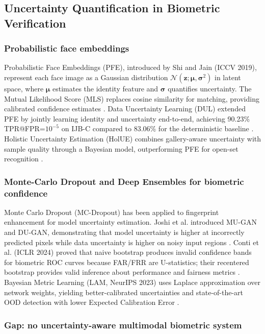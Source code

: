 \documentclass[10pt,journal,compsoc]{IEEEtran}
\begin{document}
\subsection{Uncertainty Quantification in Biometric Verification}

\subsubsection{Probabilistic face embeddings}

Probabilistic Face Embeddings (PFE), introduced by Shi and Jain (ICCV 2019), represent each face image as a Gaussian distribution $\mathcal{N}(\mathbf{z}; \boldsymbol{\mu}, \boldsymbol{\sigma}^2)$ in latent space, where $\boldsymbol{\mu}$ estimates the identity feature and $\boldsymbol{\sigma}$ quantifies uncertainty. The Mutual Likelihood Score (MLS) replaces cosine similarity for matching, providing calibrated confidence estimates \cite{REF1}. Data Uncertainty Learning (DUL) extended PFE by jointly learning identity and uncertainty end-to-end, achieving 90.23\% TPR@FPR=$10^{-5}$ on IJB-C compared to 83.06\% for the deterministic baseline \cite{REF2}. Holistic Uncertainty Estimation (HolUE) combines gallery-aware uncertainty with sample quality through a Bayesian model, outperforming PFE for open-set recognition \cite{REF6}.

\subsubsection{Monte-Carlo Dropout and Deep Ensembles for biometric confidence}

Monte Carlo Dropout (MC-Dropout) has been applied to fingerprint enhancement for model uncertainty estimation. Joshi et al. introduced MU-GAN and DU-GAN, demonstrating that model uncertainty is higher at incorrectly predicted pixels while data uncertainty is higher on noisy input regions \cite{REF3}. Conti et al. (ICLR 2024) proved that naive bootstrap produces invalid confidence bands for biometric ROC curves because FAR/FRR are U-statistics; their recentered bootstrap provides valid inference about performance and fairness metrics \cite{REF5}. Bayesian Metric Learning (LAM, NeurIPS 2023) uses Laplace approximation over network weights, yielding better-calibrated uncertainties and state-of-the-art OOD detection with lower Expected Calibration Error \cite{REF7}.

\subsubsection{Gap: no uncertainty-aware multimodal biometric system}
\end{document}
